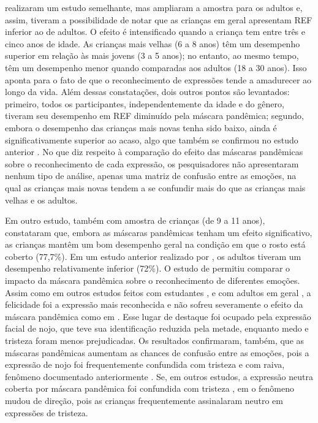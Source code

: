 \documentclass[portuguese]{textolivre}
\begin{document}
\textcite{gori_masking_2021} realizaram um estudo semelhante, mas ampliaram a amostra para os adultos e, assim, tiveram a possibilidade de notar que as crianças em geral apresentam REF inferior ao de adultos. O efeito é intensificado quando a criança tem entre três e cinco anos de idade. As crianças mais velhas (6 a 8 anos) têm um desempenho superior em relação às mais jovens (3 a 5 anos); no entanto, ao mesmo tempo, têm um desempenho menor quando comparadas aos adultos (18 a 30 anos). Isso aponta para o fato de que o reconhecimento de expressões tende a amadurecer ao longo da vida. Além dessas constatações, dois outros pontos são levantados: primeiro, todos os participantes, independentemente da idade e do gênero, tiveram seu desempenho em REF diminuído pela máscara pandêmica; segundo, embora o desempenho das crianças mais novas tenha sido baixo, ainda é significativamente superior ao acaso, algo que também se confirmou no estudo anterior \cite{ruba_childrens_2020}. No que diz respeito à comparação do efeito das máscaras pandêmicas sobre o reconhecimento de cada expressão, os pesquisadores não apresentaram nenhum tipo de análise, apenas uma matriz de confusão entre as emoções, na qual as crianças mais novas tendem a se confundir mais do que as crianças mais velhas e os adultos. 


Em outro estudo, também com amostra de crianças (de 9 a 11 anos), \textcite{carbon_impact_2021} constataram que, embora as máscaras pandêmicas tenham um efeito significativo, as crianças mantêm um bom desempenho geral na condição em que o rosto está coberto (77,7\%). Em um estudo anterior realizado por \textcite{carbon_wearing_2020}, os adultos tiveram um desempenho relativamente inferior (72\%). O estudo de \textcite{carbon_impact_2021} permitiu comparar o impacto da máscara pandêmica sobre o reconhecimento de diferentes emoções. Assim como em outros estudos feitos com estudantes \cite{bani_behind_2021}, e com adultos em geral \cite{marini_impact_2021, noyes_effect_2021}, a felicidade foi a expressão mais reconhecida e não sofreu severamente o efeito da máscara pandêmica como em \textcite{bani_behind_2021}. Esse lugar de destaque foi ocupado pela expressão facial de nojo, que teve sua identificação reduzida pela metade, enquanto medo e tristeza foram menos prejudicadas. Os resultados confirmaram, também, que as máscaras pandêmicas aumentam as chances de confusão entre as emoções, pois a expressão de nojo foi frequentemente confundida com tristeza e com raiva, fenômeno documentado anteriormente \cite{calbi_consequences_2021,carbon_wearing_2020, marini_impact_2021}. Se, em outros estudos, a expressão neutra coberta por máscara pandêmica foi confundida com tristeza \cite{carbon_wearing_2020, marini_impact_2021}, em \textcite{carbon_impact_2021} o fenômeno mudou de direção, pois as crianças frequentemente assinalaram neutro em expressões de tristeza. 
\end{document}

